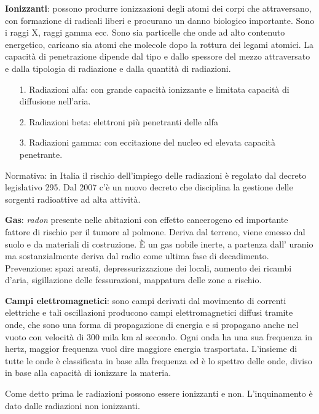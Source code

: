 \textbf{Ionizzanti}: possono produrre ionizzazioni degli atomi dei corpi
che attraversano, con formazione di radicali liberi e procurano un danno
biologico importante. Sono i raggi X, raggi gamma ecc. Sono sia
particelle che onde ad alto contenuto energetico, caricano sia atomi che
molecole dopo la rottura dei legami atomici. La capacità di penetrazione
dipende dal tipo e dallo spessore del mezzo attraversato e dalla
tipologia di radiazione e dalla quantità di radiazioni.

\begin{itemize}
\item[1.]
  Radiazioni alfa: con grande capacità ionizzante e limitata capacità di
  diffusione nell'aria.
\item[2.]
  Radiazioni beta: elettroni più penetranti delle alfa
\item[3.]
  Radiazioni gamma: con eccitazione del nucleo ed elevata capacità
  penetrante.
\end{itemize}

Normativa: in Italia il rischio dell'impiego delle radiazioni è regolato
dal decreto legislativo 295. Dal 2007 c'è un nuovo decreto che
disciplina la gestione delle sorgenti radioattive ad alta attività.

\textbf{Gas}: \emph{radon} presente nelle abitazioni con effetto
cancerogeno ed importante fattore di rischio per il tumore al polmone.
Deriva dal terreno, viene emesso dal suolo e da materiali di
costruzione. È un gas nobile inerte, a partenza dall' uranio ma
sostanzialmente deriva dal radio come ultima fase di decadimento.
Prevenzione: spazi areati, depressurizzazione dei locali, aumento dei
ricambi d'aria, sigillazione delle fessurazioni, mappatura delle zone a
rischio.

\textbf{Campi elettromagnetici}: sono campi derivati dal movimento di
correnti elettriche e tali oscillazioni producono campi elettromagnetici
diffusi tramite onde, che sono una forma di propagazione di energia e si
propagano anche nel vuoto con velocità di 300 mila km al secondo. Ogni
onda ha una sua frequenza in hertz, maggior frequenza vuol dire maggiore
energia trasportata. L'insieme di tutte le onde è classificata in base
alla frequenza ed è lo spettro delle onde, diviso in base alla capacità
di ionizzare la materia.

Come detto prima le radiazioni possono essere ionizzanti e non.
L'inquinamento è dato dalle radiazioni non ionizzanti.

